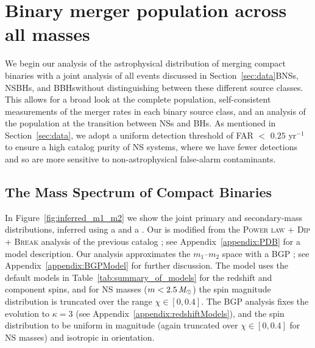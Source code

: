 \section{Binary merger population across all masses} \label{sec:all_masses}

We begin our analysis of the astrophysical distribution of merging compact binaries with a joint analysis of all events discussed in Section~\ref{sec:data}\textemdash \acp{BNS}, \acp{NSBH}, and \acp{BBH}\textemdash without distinguishing between these different source classes.
This allows for a broad look at the complete population, self-consistent measurements of the merger rates in each binary source class, and an analysis of the population at the transition between \acp{NS} and \acp{BH}.
As mentioned in Section~\ref{sec:data}, we adopt a uniform detection threshold of FAR $<$ $0.25$ $\text{yr}^{-1}$ to ensure a high catalog purity of \ac{NS} systems, where we have fewer detections and so are more sensitive to non-astrophysical false-alarm contaminants.

\subsection{The Mass Spectrum of Compact Binaries}

In Figure~\ref{fig:inferred_m1_m2} we show the joint primary and secondary-mass distributions, inferred using a \parametricAdj and a \nonparametric. 
Our \PDB \parametric is modified from the \textsc{Power law + Dip + Break} analysis of the previous \gwtcthree catalog \citep[][]{Fishbach:2020ryj, Farah:2021qom, KAGRA:2021duu, Mali:2024wpq}; see Appendix~\ref{appendix:PDB} for a model description. 
Our \nonparametricAdj analysis approximates the $m_1$--$m_2$ space with a \ac{BGP} \citep{Mandel:2016prl,KAGRA:2021duu,Ray:2023upk,Ray:2024hos}; see Appendix~\ref{appendix:BGPModel} for further discussion. 
The \PDB model uses the default models in Table~\ref{tab:summary_of_models} for the redshift and component spins, and for \ac{NS} masses ($m < 2.5\,\mathit{M_\odot}$) the spin magnitude distribution is truncated over the range $\chi \in [0,0.4]$. 
The \ac{BGP} analysis fixes the \powerlawRedshift evolution to $\kappa = 3$ (see Appendix~\ref{appendix:redshiftModels}), and the spin distribution to be uniform in magnitude (again truncated over $\chi \in [0,0.4]$ for \ac{NS} masses) and isotropic in orientation.


